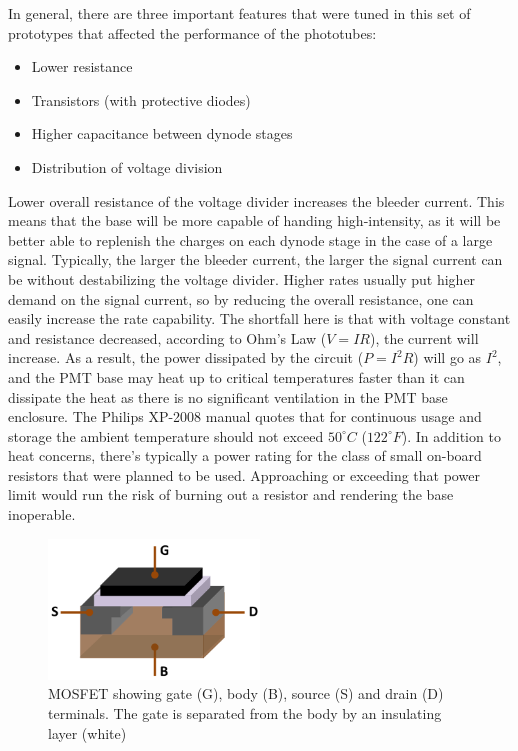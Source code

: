 In general, there are three important features that were tuned in this set of prototypes that affected the performance of the phototubes:
\begin{itemize}
	\item
	Lower resistance
	\item
	Transistors (with protective diodes)
	\item
	Higher capacitance between dynode stages
	\item
	Distribution of voltage division
\end{itemize}

Lower overall resistance of the voltage divider increases the bleeder current. This means that the base will be more capable of handing high-intensity, as it will be better able to replenish the charges on each dynode stage in the case of a large signal. Typically, the larger the bleeder current, the larger the signal current can be without destabilizing the voltage divider. Higher rates usually put higher demand on the signal current, so by reducing the overall resistance, one can easily increase the rate capability. The shortfall here is that with voltage constant and resistance decreased, according to Ohm's Law ($V = IR$), the current will increase. As a result, the power dissipated by the circuit ($P = I^2 R$) will go as $I^2$, and the PMT base may heat up to critical temperatures faster than it can dissipate the heat as there is no significant ventilation in the PMT base enclosure. The Philips XP-2008 manual quotes that for continuous usage and storage the ambient temperature should not exceed $50^\circ C$ ($122^\circ F$). In addition to heat concerns, there's typically a power rating for the class of small on-board resistors that were planned to be used. Approaching or exceeding that power limit would run the risk of burning out a resistor and rendering the base inoperable. 

\begin{figure}[b]
	\centering
	\includegraphics[width=0.5\textwidth]{figures/MOSFET_Structure.png}
	\caption{MOSFET showing gate (G), body (B), source (S) and drain (D) terminals. The gate is separated from the body by an insulating layer (white)~\cite{wmc:mosfet}}
	\label{fig:mosfet}
\end{figure}

